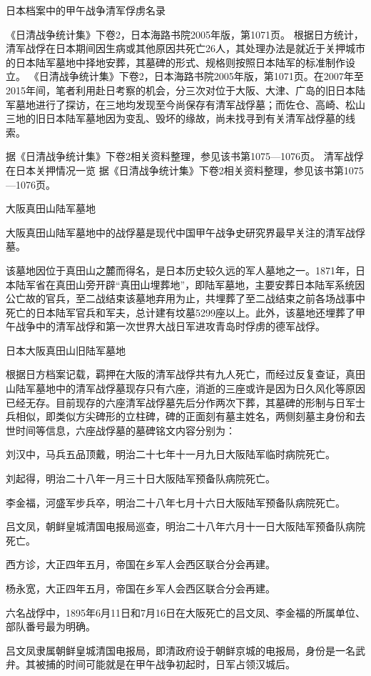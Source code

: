 \documentclass[12pt,UTF8]{ctexbook}
\begin{document}
日本档案中的甲午战争清军俘虏名录

《日清战争统计集》下卷2，日本海路书院2005年版，第1071页。
根据日方统计，清军战俘在日本期间因生病或其他原因共死亡26人，其处理办法是就近于关押城市的日本陆军墓地中择地安葬，其墓碑的形式、规格则按照日本陆军的标准制作设立。 《日清战争统计集》下卷2，日本海路书院2005年版，第1071页。在2007年至2015年间，笔者利用赴日考察的机会，分三次对位于大阪、大津、广岛的旧日本陆军墓地进行了探访，在三地均发现至今尚保存有清军战俘墓；而佐仓、高崎、松山三地的旧日本陆军墓地因为变乱、毁坏的缘故，尚未找寻到有关清军战俘墓的线索。

据《日清战争统计集》下卷2相关资料整理，参见该书第1075—1076页。
清军战俘在日本关押情况一览 据《日清战争统计集》下卷2相关资料整理，参见该书第1075—1076页。


大阪真田山陆军墓地

大阪真田山陆军墓地中的战俘墓是现代中国甲午战争史研究界最早关注的清军战俘墓。

该墓地因位于真田山之麓而得名，是日本历史较久远的军人墓地之一。1871年，日本陆军省在真田山旁开辟“真田山埋葬地”，即陆军墓地，主要安葬日本陆军系统因公亡故的官兵，至二战结束该墓地弃用为止，共埋葬了至二战结束之前各场战事中死亡的日本陆军官兵和军夫，总计建有坟墓5299座以上。此外，该墓地还埋葬了甲午战争中的清军战俘和第一次世界大战日军进攻青岛时俘虏的德军战俘。


日本大阪真田山旧陆军墓地

根据日方档案记载，羁押在大阪的清军战俘共有九人死亡，而经过反复查证，真田山陆军墓地中的清军战俘墓现存只有六座，消逝的三座或许是因为日久风化等原因已经无存。目前现存的六座清军战俘墓先后分作两次下葬，其墓碑的形制与日军士兵相似，即类似方尖碑形的立柱碑，碑的正面刻有墓主姓名，两侧刻墓主身份和去世时间等信息，六座战俘墓的墓碑铭文内容分别为：

刘汉中，马兵五品顶戴，明治二十七年十一月九日大阪陆军临时病院死亡。

刘起得，明治二十八年一月三十日大阪陆军预备队病院死亡。

李金福，河盛军步兵卒，明治二十八年七月十六日大阪陆军预备队病院死亡。

吕文凤，朝鲜皇城清国电报局巡查，明治二十八年六月十一日大阪陆军预备队病院死亡。

西方诊，大正四年五月，帝国在乡军人会西区联合分会再建。

杨永宽，大正四年五月，帝国在乡军人会西区联合分会再建。

六名战俘中，1895年6月11日和7月16日在大阪死亡的吕文凤、李金福的所属单位、部队番号最为明确。

吕文凤隶属朝鲜皇城清国电报局，即清政府设于朝鲜京城的电报局，身份是一名武弁。其被捕的时间可能就是在甲午战争初起时，日军占领汉城后。
\end{document}
